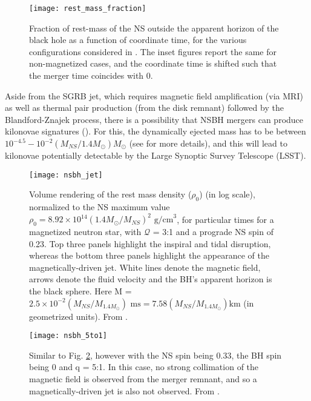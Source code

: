     \begin{figure}[H]
        \centering
        \texttt{[image: rest\_mass\_fraction]}
        \caption[Rest mass outside black hole horizon, as a function of time]
        {
            Fraction of rest-mass of the NS outside the apparent horizon of the black
            hole as a function of coordinate time, for the various configurations
            considered in \cite{ruiz_2020}. The inset figures report the same for
            non-magnetized cases, and the coordinate time is shifted such that the
            merger time coincides with 0.
        }
        \label{fig:rest_mass_fraction}
    \end{figure}

    Aside from the SGRB jet, which requires magnetic field amplification (via MRI) as
    well as thermal pair production (from the disk remnant) followed by the
    Blandford-Znajek process, there is a possibility that NSBH mergers can produce
    kilonovae signatures (\cite{barbieri_2019b}). For this, the dynamically ejected mass
    has to be between $10^{-4.5} - 10^{-2} (M_{NS}/1.4 M_{\odot}) M_{\odot}$ (see
    \cite{ruiz_2020} for more details), and this will lead to kilonovae potentially
    detectable by the Large Synoptic Survey Telescope (LSST).

    \begin{figure}[H]
        \centering
        \texttt{[image: nsbh\_jet]}
        \caption[Tidal disruption of a NS in a 3:1 NSBH binary]
        {
            Volume rendering of the rest mass density ($\rho_0$) (in log scale),
            normalized to the NS maximum value $\rho_0 = 8.92 \times 10^{14} (1.4
            M_{\odot}/M_{NS})^2 \text{ g/cm}^3$, for particular times for a magnetized
            neutron star, with $\mathcal{Q}$ = 3:1 and a prograde NS spin of 0.23.  Top
            three panels highlight the inspiral and tidal disruption, whereas the
            bottom three panels highlight the appearance of the magnetically-driven jet.
            White lines denote the magnetic field, arrows denote the fluid velocity and
            the BH's apparent horizon is the black sphere. Here M = $2.5 \times 10^{-2}
            (M_{NS}/M_{1.4M_{\odot}}) \text{ ms} = 7.58 (M_{NS}/M_{1.4M_{\odot}}) \text{
            km}$ (in geometrized units). From \cite{ruiz_2020}.
        }
        \label{fig:nsbh_jet}
    \end{figure}

    \begin{figure}[H]
        \centering
        \texttt{[image: nsbh\_5to1]}
        \caption[Tidal disruption of a NS in a 5:1 NSBH binary]
        {
            Similar to Fig. \ref{fig:nsbh_jet}, however with the NS spin being
            0.33, the BH spin being 0 and q = 5:1. In this case, no strong
            collimation of the magnetic field is observed from the merger
            remnant, and so a magnetically-driven jet is also not observed.
            From \cite{ruiz_2020}.
        }
        \label{fig:nsbh_5to1}
    \end{figure}

